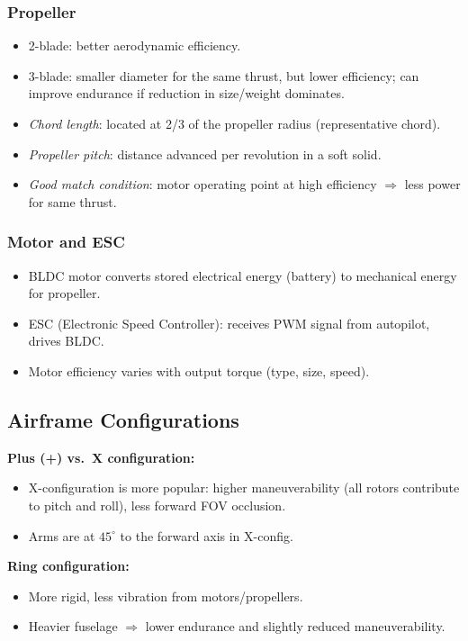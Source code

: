 \documentclass[11pt,a4paper]{article}
\begin{document}
\subsubsection*{Propeller}
\begin{itemize}
  \item 2-blade: better aerodynamic efficiency.
  \item 3-blade: smaller diameter for the same thrust, but lower efficiency; can improve endurance if reduction in size/weight dominates.
  \item \emph{Chord length}: located at 2/3 of the propeller radius (representative chord).
  \item \emph{Propeller pitch}: distance advanced per revolution in a soft solid.
  \item \emph{Good match condition}: motor operating point at high efficiency $\Rightarrow$ less power for same thrust.
\end{itemize}

\subsubsection*{Motor and ESC}
\begin{itemize}
  \item BLDC motor converts stored electrical energy (battery) to mechanical energy for propeller.
  \item ESC (Electronic Speed Controller): receives PWM signal from autopilot, drives BLDC.
  \item Motor efficiency varies with output torque (type, size, speed).
\end{itemize}

\subsection{Airframe Configurations}

\textbf{Plus (+) vs.\ X configuration:}
\begin{itemize}
  \item X-configuration is more popular: higher maneuverability (all rotors contribute to pitch and roll), less forward FOV occlusion.
  \item Arms are at $45^\circ$ to the forward axis in X-config.
\end{itemize}

\textbf{Ring configuration:}
\begin{itemize}
  \item More rigid, less vibration from motors/propellers.
  \item Heavier fuselage $\Rightarrow$ lower endurance and slightly reduced maneuverability.
\end{itemize}
\end{document}
